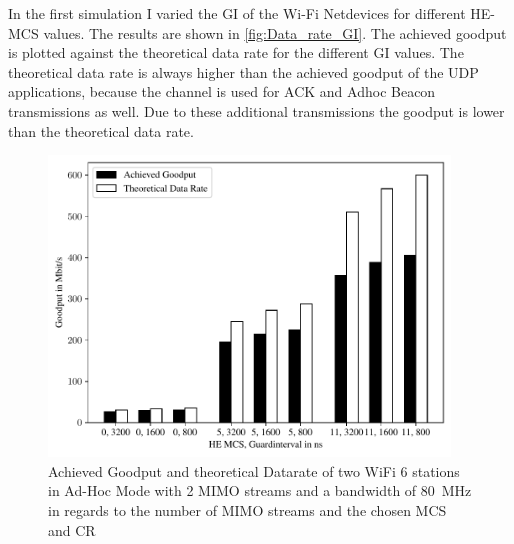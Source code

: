 In the first simulation I varied the \ac{GI} of the Wi-Fi Netdevices for different HE-\ac{MCS} values.
The results are shown in \autoref{fig:Data_rate_GI}. The achieved goodput is plotted against the theoretical data rate for the different \ac{GI} values.
The theoretical data rate is always higher than the achieved goodput of the UDP applications, because the channel is used for ACK and Adhoc Beacon transmissions as well. Due to
these additional transmissions the goodput is lower than the theoretical data rate.
\begin{figure}[H]
	\centering
	\includegraphics[width=0.95\textwidth]{figures/gi_dataRate_simulation.pdf}
	\caption{Achieved Goodput and theoretical Datarate of two WiFi 6 stations in Ad-Hoc Mode with \num{2} \ac{MIMO} streams and a bandwidth of \SI{80}{\mega\hertz} in regards to the number of \ac{MIMO} streams and the chosen \ac{MCS} and \ac{CR}}%
	\label{fig:Data_rate_GI}%
\end{figure}

